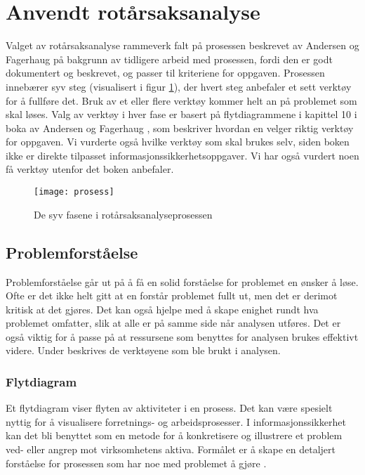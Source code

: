 \section{Anvendt rotårsaksanalyse}
Valget av rotårsaksanalyse rammeverk falt på prosessen beskrevet av Andersen og Fagerhaug på bakgrunn av tidligere arbeid med prosessen, fordi den er godt dokumentert og beskrevet, og passer til kriteriene for oppgaven. Prosessen innebærer syv steg (visualisert i figur \ref{fig:prosess}), der hvert steg anbefaler et sett verktøy for å fullføre det. Bruk av et eller flere verktøy kommer helt an på problemet som skal løses. Valg av verktøy i hver fase er basert på flytdiagrammene i kapittel 10 i boka av Andersen og Fagerhaug \cite{RCA}, som beskriver hvordan en velger riktig verktøy for oppgaven. Vi vurderte også hvilke verktøy som skal brukes selv, siden boken ikke er direkte tilpasset informasjonssikkerhetsoppgaver. Vi har også vurdert noen få verktøy utenfor det boken anbefaler. 

\begin{figure}[H]
    \centering
    \texttt{[image: prosess]}
    \caption[RCA-prosess]{De syv fasene i rotårsaksanalyseprosessen}
    \label{fig:prosess}
\end{figure}

\subsection{Problemforståelse}
Problemforståelse går ut på å få en solid forståelse for problemet en ønsker å løse. Ofte er det ikke helt gitt at en forstår problemet fullt ut, men det er derimot kritisk at det gjøres. Det kan også hjelpe med å skape enighet rundt hva problemet omfatter, slik at alle er på samme side når analysen utføres. Det er også viktig for å passe på at ressursene som benyttes for analysen brukes effektivt videre. Under beskrives de verktøyene som ble brukt i analysen. 

\subsubsection{Flytdiagram}
Et flytdiagram viser flyten av aktiviteter i en prosess. Det kan være spesielt nyttig for å visualisere forretnings- og arbeidsprosesser. I informasjonssikkerhet kan det bli benyttet som en metode for å konkretisere og illustrere et problem ved- eller angrep mot virksomhetens aktiva. Formålet er å skape en detaljert forståelse for prosessen som har noe med problemet å gjøre \cite{RCA}.


